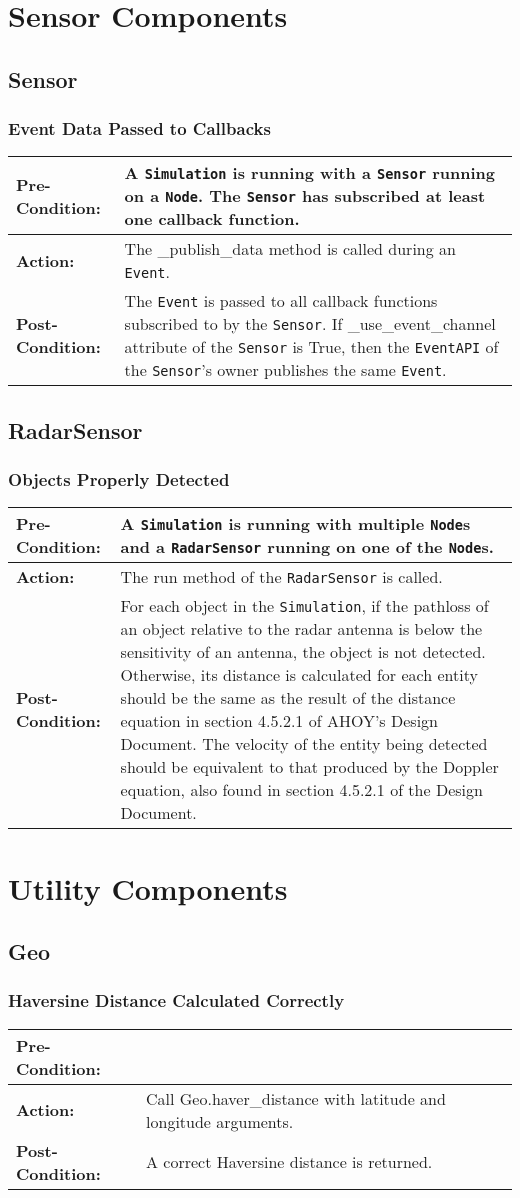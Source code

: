 \documentclass[titlepage]{article}
\newcommand{\testcase}[3]{
    \begin{center}
    \begin{tabular}{| l | p{0.7\textwidth}|}
        \hline
        \rowcolor[gray]{0.8}\textbf{Pre-Condition:} & #1 \\ \hline
        \textbf{Action:} & #2 \\ \hline
        \rowcolor[gray]{0.8}\textbf{Post-Condition:} & #3 \\ \hline
    \end{tabular}
    \end{center}
}
\begin{document}
\section{Sensor Components}
\subsection{Sensor}
\subsubsection{Event Data Passed to Callbacks}
\testcase{A \texttt{Simulation} is running with a \texttt{Sensor} running on a \texttt{Node}. The \texttt{Sensor} has
subscribed at least one callback function.}{The \_publish\_data method is called during an \texttt{Event}.}{The
\texttt{Event} is passed to all callback functions subscribed to by the \texttt{Sensor}. If \_use\_event\_channel
attribute of the \texttt{Sensor} is True, then the \texttt{EventAPI} of the \texttt{Sensor}'s owner publishes the same
\texttt{Event}.}

\subsection{RadarSensor}
\subsubsection{Objects Properly Detected}
\testcase{A \texttt{Simulation} is running with multiple \texttt{Node}s and a \texttt{RadarSensor} running on one of the
\texttt{Node}s.}{The run method of the \texttt{RadarSensor} is called.}{For each object in the \texttt{Simulation}, if
the pathloss of an object relative to the radar antenna is below the sensitivity of an antenna, the object is not
detected.  Otherwise, its distance is calculated for each entity should be the same as the result of the distance
equation in section 4.5.2.1 of AHOY's Design Document. The velocity of the entity being detected should be equivalent to
that produced by the Doppler equation, also found in section 4.5.2.1 of the Design Document.}


\section{Utility Components}
\subsection{Geo}
\subsubsection{Haversine Distance Calculated Correctly}
\testcase{}{Call Geo.haver\_distance with latitude and longitude arguments.}{A correct Haversine distance is returned.}
\end{document}
